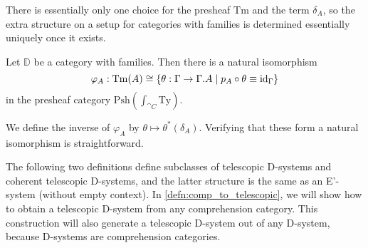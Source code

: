 There is essentially only one choice for the presheaf $\mathrm{Tm}$ and the
term $\delta_A$, so the extra structure on a setup for categories with families
is determined essentially uniquely once it exists.

\begin{defn}\label{lem:cwf_to_dsys}
Let $\mathbb{D}$ be a category with families. Then there is a natural isomorphism
\begin{equation*}
\varphi_A:\mathrm{Tm}(A)\cong\{\theta:\Gamma\to\ctxext{\Gamma}{A}\mid p_A\circ\theta\jdeq\catid{\Gamma}\}
\end{equation*}
in the presheaf category $\mathrm{Psh}(\int_{\cat{C}}\mathrm{Ty})$. 
\begin{comment}
The
natural isomorphism $\varphi$ is such that the term $\delta_A\in\mathrm{Tm}((p_A)^\ast(A))$
corresponds to the unique arrow $\tilde{q}_A$ which fits in the diagram
\begin{equation*}
\begin{tikzcd}
\ctxext{\Gamma}{A} \arrow[ddr,bend right=15,equals] \arrow[drr,bend left=15,equals] \arrow[dr,"{\tilde \delta_A}"] \\
& \ctxext{{\Gamma}{A}}{(p_A)^\ast(A)} \arrow[d,fib] & \ctxext{\Gamma}{A} \arrow[d,fib] \\
& \ctxext{\Gamma}{A} \arrow[r,"{p_A}"] & \Gamma
\end{tikzcd}
\end{equation*}
\end{comment}
\end{defn}

\begin{constr}
We define the inverse of $\varphi_A$ by $\theta\mapsto\theta^\ast(\delta_A)$. Verifying
that these form a natural isomorphism is straightforward.
\end{constr}

The following two definitions define subclasses of telescopic D-systems and 
coherent telescopic D-systems, and the latter structure is the same as an E'-system
(without empty context). In \autoref{defn:comp_to_telescopic}, we will show how
to obtain a telescopic D-system from any comprehension category. This construction
will also generate a telescopic D-system out of any D-system, because D-systems
are comprehension categories.

